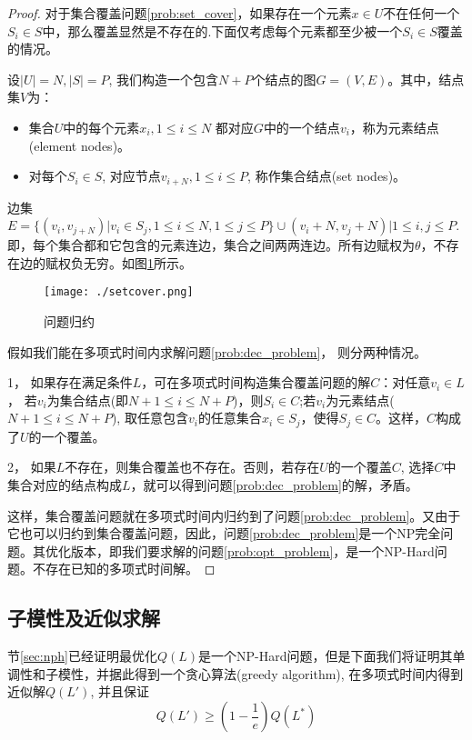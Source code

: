\begin{proof}
对于集合覆盖问题\ref{prob:set_cover}，如果存在一个元素$x \in U$不在任何一个$S_i \in S$中，那么覆盖显然是不存在的.下面仅考虑每个元素都至少被一个$S_i \in S$覆盖的情况。

设$|U| = N, |S| = P$, 我们构造一个包含$N+P$个结点的图$G=(V,E)$。其中，结点集$V$为：
\begin{itemize}
\item 集合$U$中的每个元素$x_i, 1 \le i \le N $ 都对应$G$中的一个结点$v_i$，称为元素结点(element nodes)。
\item 对每个$S_i \in S$, 对应节点$v_{i+N}, 1 \le i \le P$, 称作集合结点(set nodes)。
\end{itemize}
边集$E=\{(v_i, v_{j+N}) | v_i \in S_j, 1\le i \le N, 1\le j \le P\} \cup {(v_i+N, v_j+N) | 1 \le i,j \le P}$. 即，每个集合都和它包含的元素连边，集合之间两两连边。所有边赋权为$\theta$，不存在边的赋权负无穷。如图\ref{fig:setcover}所示。
\begin{figure}[htbp]
\centering
\texttt{[image: ./setcover.png]}
\caption{问题归约}
\label{fig:setcover}
\end{figure}

假如我们能在多项式时间内求解问题\ref{prob:dec_problem}， 则分两种情况。

1， 如果存在满足条件$L$，可在多项式时间构造集合覆盖问题的解$C$：对任意$v_i \in L$， 若$v_i$为集合结点(即$N+1 \le i \le N+P$)，则$S_i \in C$;若$v_i$为元素结点($N+1 \le i \le N+P$), 取任意包含$v_i$的任意集合$x_i \in S_j$，使得$S_j \in C$。这样，$C$构成了$U$的一个覆盖。

2， 如果$L$不存在，则集合覆盖也不存在。否则，若存在$U$的一个覆盖$C$, 选择$C$中集合对应的结点构成$L$，就可以得到问题\ref{prob:dec_problem}的解，矛盾。

这样，集合覆盖问题就在多项式时间内归约到了问题\ref{prob:dec_problem}。又由于它也可以归约到集合覆盖问题，因此，问题\ref{prob:dec_problem}是一个NP完全问题。其优化版本，即我们要求解的问题\ref{prob:opt_problem}，是一个NP-Hard问题。不存在已知的多项式时间解。
\end{proof}

\subsection{子模性及近似求解}

节\ref{sec:nph}已经证明最优化$Q(L)$是一个NP-Hard问题，但是下面我们将证明其单调性和子模性，并据此得到一个贪心算法(greedy algorithm), 在多项式时间内得到近似解$Q(L')$, 并且保证
\[
	Q(L') \ge (1-\frac{1}{e}) Q(L^*)
\]

